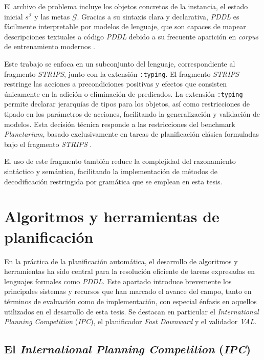 El archivo de problema incluye los objetos concretos de la instancia, el estado inicial $s^{\mathcal{I}}$ y las metas $\mathcal{G}$. Gracias a su sintaxis clara y declarativa, \textit{PDDL} es fácilmente interpretable por modelos de lenguaje, que son capaces de mapear descripciones textuales a código \textit{PDDL} debido a su frecuente aparición en \textit{corpus} de entrenamiento modernos \parencite{tantakoun2025llms}.

Este trabajo se enfoca en un subconjunto del lenguaje, correspondiente al fragmento \textit{STRIPS}, junto con la extensión \texttt{:typing}. El fragmento \textit{STRIPS} restringe las acciones a precondiciones positivas y efectos que consisten únicamente en la adición o eliminación de predicados. La extensión \texttt{:typing} permite declarar jerarquías de tipos para los objetos, así como restricciones de tipado en los parámetros de acciones, facilitando la generalización y validación de modelos. Esta decisión técnica responde a las restricciones del benchmark \textit{Planetarium}, basado exclusivamente en tareas de planificación clásica formuladas bajo el fragmento \textit{STRIPS} \parencite{aeronautiques1998pddl, fikes1971strips}.

El uso de este fragmento también reduce la complejidad del razonamiento sintáctico y semántico, facilitando la implementación de métodos de decodificación restringida por gramática que se emplean en esta tesis.

\section{Algoritmos y herramientas de planificación}

En la práctica de la planificación automática, el desarrollo de algoritmos y herramientas ha sido central para la resolución eficiente de tareas expresadas en lenguajes formales como \textit{PDDL}. Este apartado introduce brevemente los principales sistemas y recursos que han marcado el avance del campo, tanto en términos de evaluación como de implementación, con especial énfasis en aquellos utilizados en el desarrollo de esta tesis. Se destacan en particular el \textit{International Planning Competition} (\textit{IPC}), el planificador \textit{Fast Downward} y el validador \textit{VAL}.

\subsection{El \textit{International Planning Competition} (\textit{IPC})}

